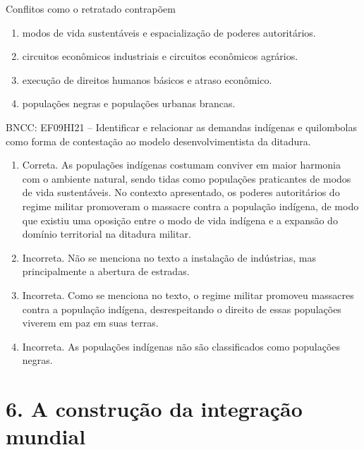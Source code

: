 
Conflitos como o retratado contrapõem

\begin{enumerate}
\def\labelenumi{\alph{enumi})}
\item
  modos de vida sustentáveis e espacialização de poderes autoritários.
\item
  circuitos econômicos industriais e circuitos econômicos agrários.
\item
  execução de direitos humanos básicos e atraso econômico.
\item
  populações negras e populações urbanas brancas.
\end{enumerate}

BNCC: EF09HI21 -- Identificar e relacionar as demandas indígenas e
quilombolas como forma de contestação ao modelo desenvolvimentista da
ditadura.

\begin{enumerate}
\def\labelenumi{\alph{enumi})}
\item
  Correta. As populações indígenas costumam conviver em maior harmonia
  com o ambiente natural, sendo tidas como populações praticantes de
  modos de vida sustentáveis. No contexto apresentado, os poderes
  autoritários do regime militar promoveram o massacre contra a
  população indígena, de modo que existiu uma oposição entre o modo de
  vida indígena e a expansão do domínio territorial na ditadura militar.
\item
  Incorreta. Não se menciona no texto a instalação de indústrias, mas
  principalmente a abertura de estradas.
\item
  Incorreta. Como se menciona no texto, o regime militar promoveu
  massacres contra a população indígena, desrespeitando o direito de
  essas populações viverem em paz em suas terras.
\item
  Incorreta. As populações indígenas não são classificados como
  populações negras.
\end{enumerate}

\chapter{6. A construção da integração
mundial}

